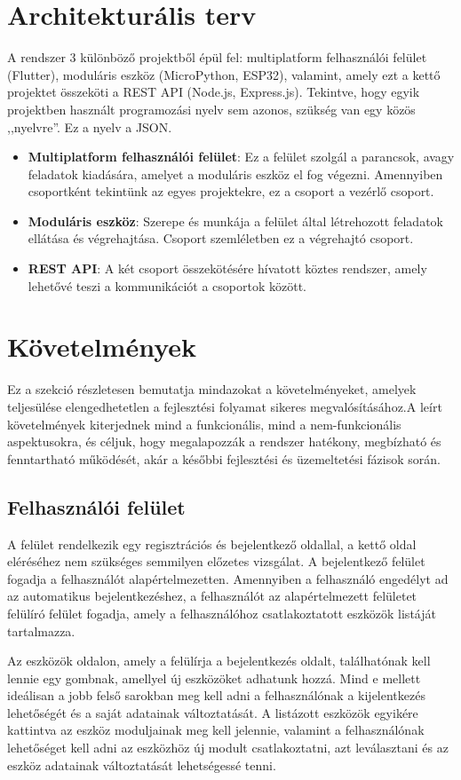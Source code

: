 \documentclass{thesis-ekf}
\theoremstyle{definition}
\theoremstyle{remark}
\begin{document}
	\section{Architekturális terv}
	A rendszer 3 különböző projektből épül fel: multiplatform felhasználói felület (Flutter), moduláris eszköz (MicroPython, ESP32), valamint, amely ezt a kettő projektet összeköti a REST API (Node.js, Express.js). Tekintve, hogy egyik projektben használt programozási nyelv sem azonos, szükség van egy közös ,,nyelvre''. Ez a nyelv a JSON.
	\begin{itemize}
		\item \textbf{Multiplatform felhasználói felület}: Ez a felület szolgál a parancsok, avagy feladatok kiadására, amelyet a moduláris eszköz el fog végezni. Amennyiben csoportként tekintünk az egyes projektekre, ez a csoport a vezérlő csoport.
		\item \textbf{Moduláris eszköz}: Szerepe és munkája a felület által létrehozott feladatok ellátása és végrehajtása. Csoport szemléletben ez a végrehajtó csoport.
		\item \textbf{REST API}: A két csoport összekötésére hívatott köztes rendszer, amely lehetővé teszi a kommunikációt a csoportok között.
	\end{itemize}
	\section{Követelmények}
	\label{sec_kovetelmenyek}
	Ez a szekció részletesen bemutatja mindazokat a követelményeket, amelyek teljesülése elengedhetetlen a fejlesztési folyamat sikeres megvalósításához.A leírt követelmények kiterjednek mind a funkcionális, mind a nem-funkcionális aspektusokra, és céljuk, hogy megalapozzák a rendszer hatékony, megbízható és fenntartható működését, akár a későbbi fejlesztési és üzemeltetési fázisok során.
	\subsection{Felhasználói felület}
	A felület rendelkezik egy regisztrációs és bejelentkező oldallal, a kettő oldal eléréséhez nem szükséges semmilyen előzetes vizsgálat. A bejelentkező felület fogadja a felhasználót alapértelmezetten.
	Amennyiben a felhasználó engedélyt ad az automatikus bejelentkezéshez, a felhasználót az alapértelmezett felületet felülíró felület fogadja, amely a felhasználóhoz csatlakoztatott eszközök listáját tartalmazza.
	
	Az eszközök oldalon, amely a felülírja a bejelentkezés oldalt, találhatónak kell lennie egy gombnak, amellyel új eszközöket adhatunk hozzá. Mind e mellett ideálisan a jobb felső sarokban meg kell adni a felhasználónak a kijelentkezés lehetőségét és a saját adatainak változtatását. A listázott eszközök egyikére kattintva az eszköz moduljainak meg kell jelennie, valamint a felhasználónak lehetőséget kell adni az eszközhöz új modult csatlakoztatni, azt leválasztani és az eszköz adatainak változtatását lehetségessé tenni.
	
\end{document}
